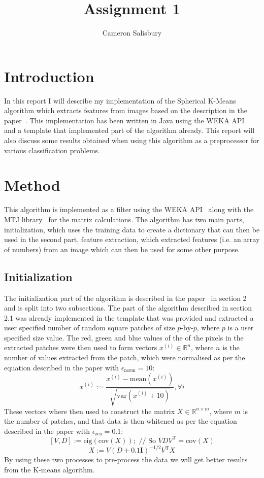 \documentclass{article}
\begin{document}
\title{Assignment 1}
\author{Cameron Salisbury}

\maketitle

\section{Introduction}

In this report I will describe my implementation of the Spherical K-Means algorithm which extracts features from images based on the description in the paper~\cite{paper}. This implementation has been written in Java using the WEKA API~\cite{weka} and a template that implemented part of the algorithm already. This report will also discuss some results obtained when using this algorithm as a preprocessor for various classification problems.

\section{Method}

This algorithm is implemented as a filter using the WEKA API~\cite{weka} along with the MTJ library~\cite{matrix_lib} for the matrix calculations. The algorithm has two main parts, initialization, which uses the training data to create a dictionary that can then be used in the second part, feature extraction, which extracted features (i.e. an array of numbers) from an image which can then be used for some other purpose.

\subsection{Initialization}

The initialization part of the algorithm is described in the paper~\cite{paper} in section 2 and is  split into two subsections. The part of the algorithm described in section 2.1 was already implemented in the template that was provided and extracted a user specified number of random square patches of size $p\textrm{-by-}p$, where $p$ is a user specified size value. The red, green and blue values of the of the pixels in the extracted patches were then used to form vectors $x^{(i)} \in \mathbb{R}^n$, where $n$ is the number of values extracted from the patch, which were normalised as per the equation described in the paper with $\epsilon_{\mathrm{norm}}=10$:
\[
x^{(i)} := \frac{x^{(i)} - \mathrm{mean} \left( x^{(i)} \right) }{\sqrt{\mathrm{var} \left( x^{(i)} + 10 \right) }}, \forall i
\]
These vectors where then used to construct the matrix $X \in \mathbb{R}^{n \times m}$, where $m$ is the number of patches, and that data is then whitened as per the equation described in the paper with $\epsilon_{\mathrm{zca}}=0.1$:
\[
[V,D] := \mathrm{eig} \left( \mathrm{cov} \left( X \right) \right) ; \textrm{ // So } VDV^{\mathrm{T}} = \mathrm{cov} \left( X \right)
\]\[
X := V \left( D + 0.1 \boldsymbol{I} \right) ^{-1/2} V^{\mathrm{T}} X
\]
By using these two processes to pre-process the data we will get better results from the K-means algorithm.
\end{document}

